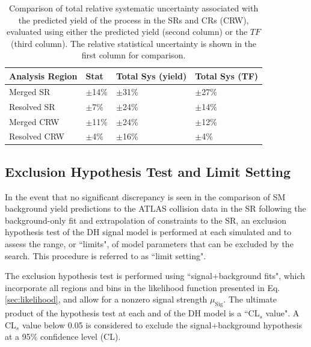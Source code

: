 \begin{table}[ht]
\begin{center}
\caption[Comparison of total relative systematic uncertainty associated with the predicted yield of the \wjets process in signal and control regions, evaluated using either the predicted yield or the transfer factor.]{\label{tab:TF_sys_comp} Comparison of total relative systematic uncertainty associated with the predicted yield of the \wjets process in the SRs and \wjets CRs (CRW), evaluated using either the predicted yield (second column) or the \(TF\) (third column). The relative statistical uncertainty is shown in the first column for comparison.}
\begin{tabular}{l l l l }
\toprule
\textbf{Analysis Region} &\textbf{Stat} &\textbf{Total Sys (yield)} & \textbf{Total Sys (TF)} \tabularnewline
\midrule
\midrule
Merged SR & \(\pm\)14\% & \(\pm\)31\% & \(\pm\)27\% \tabularnewline
\midrule
Resolved SR & \(\pm\)7\% & \(\pm\)24\% & \(\pm\)14\% \tabularnewline
\midrule
Merged CRW & \(\pm\)11\% & \(\pm\)24\% & \(\pm\)12\% \tabularnewline
\midrule
Resolved CRW & \(\pm\)4\% & \(\pm\)16\% & \(\pm\)4\% \tabularnewline
\bottomrule
\end{tabular}
\end{center}
\end{table}

\subsection{Exclusion Hypothesis Test and Limit Setting}
\label{sec:hypo_test}

In the event that no significant discrepancy is seen in the comparison of SM background yield predictions to the ATLAS collision data in the SR following the background-only fit and extrapolation of constraints to the SR, an exclusion hypothesis test of the DH signal model is performed at each simulated \ms and \mZp to assess the range, or ``limits", of model parameters that can be excluded by the search. This procedure is referred to as ``limit setting".

The exclusion hypothesis test is performed using ``signal+background fits", which incorporate all regions and bins in the likelihood function presented in Eq. \ref{sec:likelihood}, and allow for a nonzero signal strength \(\mu_\text{Sig}\). The ultimate product of the hypothesis test at each \ms and \mZp of the DH model is a ``CL\(_s\) value". A CL\(_s\) value below 0.05 is considered to exclude the signal+background hypothesis at a 95\% confidence level (CL).


